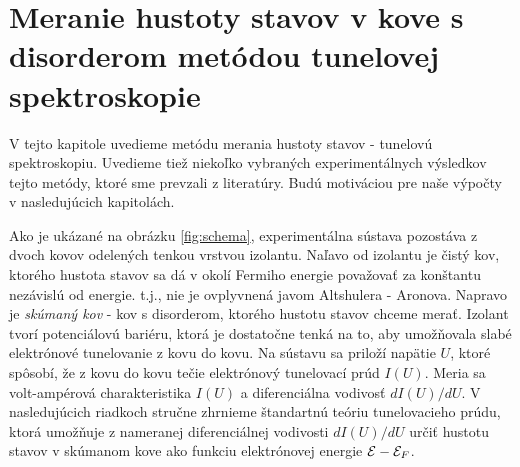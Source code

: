 \section {Meranie hustoty stavov v kove s disorderom metódou tunelovej spektroskopie}

V tejto kapitole uvedieme metódu merania hustoty stavov - tunelovú spektroskopiu.
Uvedieme tiež niekoľko vybraných experimentálnych výsledkov tejto metódy, ktoré sme prevzali z literatúry. Budú
motiváciou pre naše výpočty v nasledujúcich kapitolách.

Ako je ukázané na obrázku  \eqref{fig:schema}, experimentálna sústava pozostáva z dvoch kovov odelených tenkou vrstvou izolantu. Naľavo od izolantu je čistý
kov, ktorého hustota stavov sa dá v okolí Fermiho energie považovať za konštantu nezávislú od energie. t.j., nie je ovplyvnená javom Altshulera - Aronova. Napravo je {\it skúmaný kov} - kov s disorderom, ktorého
hustotu stavov chceme merať. Izolant tvorí potenciálovú bariéru, ktorá je dostatočne tenká na to, aby umožňovala slabé elektrónové tunelovanie z kovu do kovu.
Na sústavu sa priloží napätie  $U$, ktoré spôsobí, že z kovu do kovu tečie elektrónový tunelovací prúd $I(U)$. Meria sa volt-ampérová charakteristika $I(U)$ a diferenciálna vodivosť $dI(U)/dU$.
V nasledujúcich riadkoch stručne zhrnieme štandartnú teóriu tunelovacieho prúdu, ktorá umožňuje z nameranej diferenciálnej vodivosti $dI(U)/dU$ určiť hustotu stavov v skúmanom kove ako funkciu
elektrónovej energie $\mathcal{E}-\mathcal{E}_F$.


